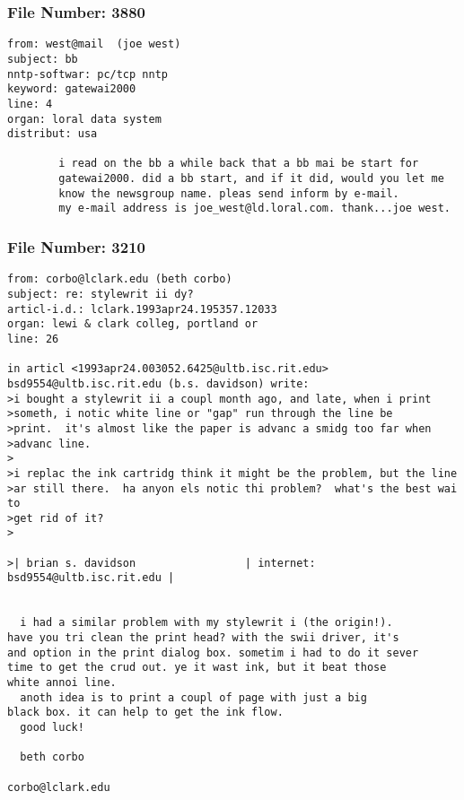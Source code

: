 \subsubsection*{File Number: 3880}
\scriptsize\begin{verbatim}
from: west@mail  (joe west)
subject: bb 
nntp-softwar: pc/tcp nntp
keyword: gatewai2000 
line: 4         
organ: loral data system
distribut: usa 

        i read on the bb a while back that a bb mai be start for
        gatewai2000. did a bb start, and if it did, would you let me
        know the newsgroup name. pleas send inform by e-mail.
        my e-mail address is joe_west@ld.loral.com. thank...joe west.

\end{verbatim}
\subsubsection*{File Number: 3210}
\scriptsize\begin{verbatim}
from: corbo@lclark.edu (beth corbo)
subject: re: stylewrit ii dy?
articl-i.d.: lclark.1993apr24.195357.12033
organ: lewi & clark colleg, portland or
line: 26

in articl <1993apr24.003052.6425@ultb.isc.rit.edu> bsd9554@ultb.isc.rit.edu (b.s. davidson) write:
>i bought a stylewrit ii a coupl month ago, and late, when i print
>someth, i notic white line or "gap" run through the line be
>print.  it's almost like the paper is advanc a smidg too far when
>advanc line.  
>
>i replac the ink cartridg think it might be the problem, but the line
>ar still there.  ha anyon els notic thi problem?  what's the best wai to
>get rid of it?
>

>| brian s. davidson                 | internet: bsd9554@ultb.isc.rit.edu |


  i had a similar problem with my stylewrit i (the origin!).
have you tri clean the print head? with the swii driver, it's
and option in the print dialog box. sometim i had to do it sever
time to get the crud out. ye it wast ink, but it beat those
white annoi line.
  anoth idea is to print a coupl of page with just a big
black box. it can help to get the ink flow.
  good luck!

  beth corbo

corbo@lclark.edu
\end{verbatim}
